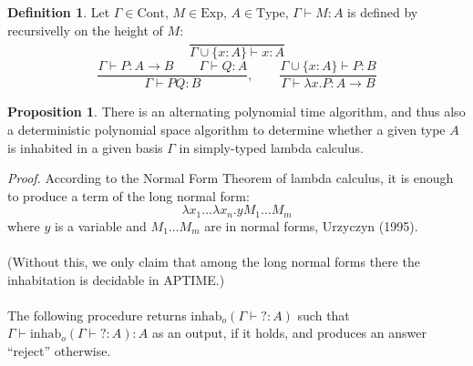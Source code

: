 \documentclass[12pt, titlepage, a4paper]{amsart}
\theoremstyle{definition}
\newtheorem{proposition}{Proposition}
\newtheorem{definition}{Definition}
\theoremstyle{theorem}
\theoremstyle{remark}
\begin{document}
\begin{definition}
Let $\Gamma\in \mathrm{Cont}$, $M\in\mathrm{Exp}$, $A\in\mathrm{Type}$, $\Gamma\vdash M:A$ is defined by recursivelly on the height of $M$:
$$\dfrac{}{\Gamma\cup\{x:A\}\vdash x:A}$$
$$\dfrac{\Gamma \vdash P:A\to B \qquad \Gamma \vdash Q:A}{\Gamma \vdash PQ:B},\qquad \dfrac{\Gamma\cup\{x:A\}\vdash P:B}{\Gamma \vdash\lambda x.P:A\to B}$$
\end{definition}
\begin{proposition}
There is an alternating polynomial time algorithm, and thus also a deterministic polynomial space algorithm to determine whether a given type $A$
is inhabited in a given basis $\Gamma$ in simply-typed lambda calculus.
\end{proposition}
\textit{Proof.} According to the Normal Form Theorem of lambda calculus, it is enough to produce a term of the long normal form:
$$\lambda x_1\dots \lambda x_n .yM_1\dots M_m$$ 
where $y$ is a variable and $M_1\dots M_m$ are in normal forms, Urzyczyn (1995).\\\\ (Without this, we only claim that among the long normal forms there the inhabitation is decidable in APTIME.)\\\\
The following procedure returns $\mathrm{inhab}_o(\Gamma\vdash ?:A)$ such that $\Gamma\vdash \mathrm{inhab}_o(\Gamma\vdash ?:A):A$ as an output, if it holds, and produces an answer “reject” otherwise.\\
\end{document}
